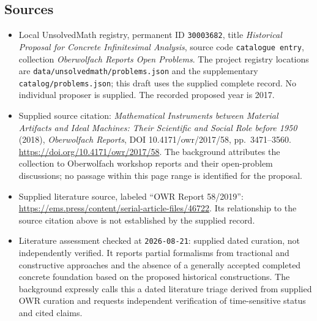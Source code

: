 \documentclass[11pt]{article}
\begin{document}
\subsection{Sources}
\begin{itemize}
\item Local UnsolvedMath registry, permanent ID \texttt{30003682}, title \emph{Historical Proposal for Concrete Infinitesimal Analysis}, source code \texttt{catalogue entry}, collection \emph{Oberwolfach Reports Open Problems}. The project registry locations are \texttt{data/unsolvedmath/problems.json} and the supplementary \texttt{catalog/problems.json}; this draft uses the supplied complete record. No individual proposer is supplied. The recorded proposed year is 2017.
\item Supplied source citation: \emph{Mathematical Instruments between Material Artifacts and Ideal Machines: Their Scientific and Social Role before 1950} (2018), \emph{Oberwolfach Reports}, DOI 10.4171/owr/2017/58, pp.~3471--3560. \url{https://doi.org/10.4171/owr/2017/58}. The background attributes the collection to Oberwolfach workshop reports and their open-problem discussions; no passage within this page range is identified for the proposal.
\item Supplied literature source, labeled ``OWR Report 58/2019'': \url{https://ems.press/content/serial-article-files/46722}. Its relationship to the source citation above is not established by the supplied record.
\item Literature assessment checked at \texttt{2026-08-21}: supplied dated curation, not independently verified. It reports partial formalisms from tractional and constructive approaches and the absence of a generally accepted completed concrete foundation based on the proposed historical constructions. The background expressly calls this a dated literature triage derived from supplied OWR curation and requests independent verification of time-sensitive status and cited claims.
\end{itemize}
\end{document}
